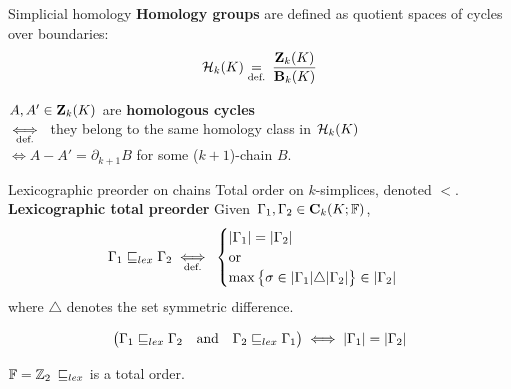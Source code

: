 \begin{frame}{Simplicial homology}
\textbf{Homology groups} are defined as quotient spaces of cycles over boundaries:
\[
\mathcal{H}_k(K) \underset{\text{def.}}{=} \: \frac{\mathbf{Z}_k(K)}{\mathbf{B}_k(K)}
\]

$A, A' \in \mathbf{Z}_k(K)$ are \textbf{homologous cycles} \\
\pause
\vspace*{5pt}
\hspace*{5pt} $\underset{\text{def.}}{\iff} \:$ they belong to the same homology class in $\mathcal{H}_k(K)$ \\
\pause
\vspace*{5pt}
\hspace*{5pt} $\iff A -  A' = \partial_{k+1}B$ for some ($k+1$)-chain $B$.

\begin{center}
\end{center}
\end{frame}

\begin{frame}{Lexicographic preorder on chains}
	Total order on $k$-simplices, denoted $<$.\\
	
	\textbf{Lexicographic total preorder} Given $\Gamma_1, \Gamma_2 \in \mathbf{C}_k(K; \mathbb{F})$,
		\[
		\Gamma_1 \sqsubseteq_{lex} \Gamma_2 \underset{\text{def.}}{\iff} \:
		\begin{cases} 
			|\Gamma_1| = |\Gamma_2| \\
			\operatorname{or} \\
			\max \big\{ \sigma \in |\Gamma_1| \triangle |\Gamma_2|  \big\}  \in |\Gamma_2|
		\end{cases}
		\]
		where $\triangle$ denotes the set symmetric difference.
		
	\[
		\big( \Gamma_1 \sqsubseteq_{lex} \Gamma_2 \quad \textrm{and} \quad  	\Gamma_2 
		\sqsubseteq_{lex}  \Gamma_1 \big) \iff |\Gamma_1| = |\Gamma_2| 
	\]
	
	\begin{alertblock}{$\mathbb{F} = \mathbb{Z}_2$}
		$\sqsubseteq_{lex}$ is a total order.
	\end{alertblock}
\end{frame}

